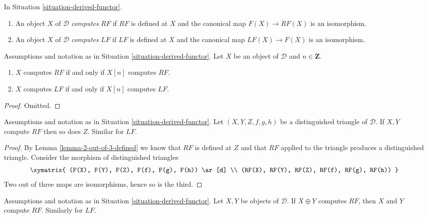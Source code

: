 \begin{definition}
\label{definition-computes}
In
Situation \ref{situation-derived-functor}.
\begin{enumerate}
\item An object $X$ of $\mathcal{D}$ {\it computes} $RF$ if $RF$ is defined
at $X$ and the canonical map $F(X) \to RF(X)$ is an isomorphism.
\item An object $X$ of $\mathcal{D}$ {\it computes} $LF$ if $LF$ is defined
at $X$ and the canonical map $LF(X) \to F(X)$ is an isomorphism.
\end{enumerate}
\end{definition}

\begin{lemma}
\label{lemma-computes-shift}
Assumptions and notation as in
Situation \ref{situation-derived-functor}.
Let $X$ be an object of $\mathcal{D}$ and $n \in \mathbf{Z}$.
\begin{enumerate}
\item $X$ computes $RF$ if and only if $X[n]$ computes $RF$.
\item $X$ computes $LF$ if and only if $X[n]$ computes $LF$.
\end{enumerate}
\end{lemma}

\begin{proof}
Omitted.
\end{proof}

\begin{lemma}
\label{lemma-2-out-of-3-computes}
Assumptions and notation as in
Situation \ref{situation-derived-functor}.
Let $(X, Y, Z, f, g, h)$ be a distinguished triangle of $\mathcal{D}$.
If $X, Y$ compute $RF$ then so does $Z$. Similar for $LF$.
\end{lemma}

\begin{proof}
By
Lemma \ref{lemma-2-out-of-3-defined}
we know that $RF$ is defined at $Z$ and that $RF$ applied to the
triangle produces a distinguished triangle.
Consider the morphism of distinguished triangles
$$
\xymatrix{
(F(X), F(Y), F(Z), F(f), F(g), F(h)) \ar[d] \\
(RF(X), RF(Y), RF(Z), RF(f), RF(g), RF(h))
}
$$
Two out of three maps are isomorphisms, hence so is the third.
\end{proof}

\begin{lemma}
\label{lemma-direct-sum-computes}
Assumptions and notation as in Situation \ref{situation-derived-functor}.
Let $X, Y$ be objects of $\mathcal{D}$. If $X \oplus Y$ computes $RF$, then
$X$ and $Y$ compute $RF$. Similarly for $LF$.
\end{lemma}

